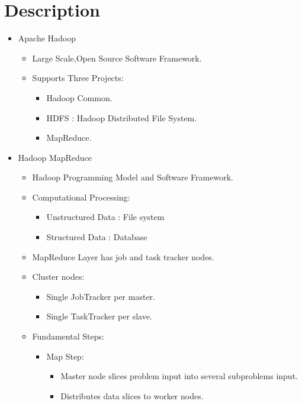 \documentclass[a4paper,10pt]{article}
\begin{document}
\section{Description}
\begin{itemize}
	\item Apache Hadoop
	\begin{itemize}
		\item Large Scale,Open Source Software Framework.
		\item Supports Three Projects:
		\begin{itemize}
			\item Hadoop Common.
			\item HDFS : Hadoop Distributed File System.
			\item MapReduce.
		\end{itemize}
	\end{itemize}
   \item Hadoop MapReduce
     \begin{itemize}
     	\item Hadoop Programming Model and Software Framework.
     	\item Computational Processing:
     	\begin{itemize}
     		\item Unstructured Data : File system
     		\item Structured Data : Database	
     	\end{itemize}
        \item MapReduce Layer has job and task tracker nodes.
        \item Cluster nodes: 
        \begin{itemize}
        	\item Single JobTracker per master.
        	\item Single TaskTracker per slave.
        \end{itemize}
        \item Fundamental Steps:
        \begin{itemize}
        	\item Map Step:
        	\begin{itemize}
        		\item Master node slices problem input into several subproblems input.
        		\item Distributes data slices to worker nodes.
        	\end{itemize}
        \end{itemize}
     \end{itemize}
\end{itemize}
\end{document}
